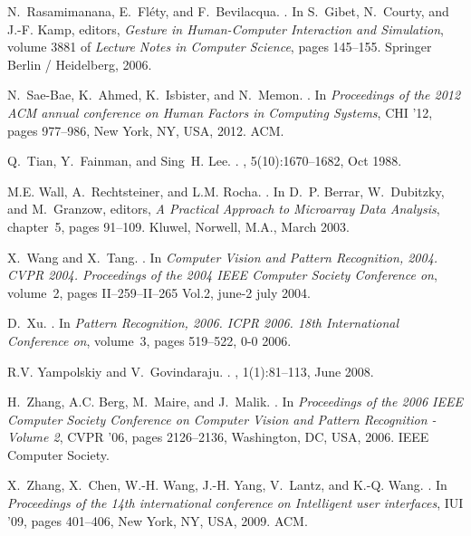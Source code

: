 \documentclass[]{article}
\begin{document}
\begin{thebibliography}{10}
N.~Rasamimanana, E.~Fl{\'e}ty, and F.~Bevilacqua.
.
\newblock In S.~Gibet, N.~Courty, and J.-F. Kamp, editors, {\em {Gesture in
  Human-Computer Interaction and Simulation}}, volume 3881 of {\em {Lecture
  Notes in Computer Science}}, pages 145--155. Springer Berlin / Heidelberg,
  2006.

N.~Sae-Bae, K.~Ahmed, K.~Isbister, and N.~Memon.
.
\newblock In {\em {Proceedings of the 2012 ACM annual conference on Human
  Factors in Computing Systems}}, {CHI '12}, pages 977--986, New York, NY, USA,
  2012. ACM.

Q.~Tian, Y.~Fainman, and Sing~H. Lee.
.
, 5(10):1670--1682, Oct 1988.

M.E. Wall, A.~Rechtsteiner, and L.M. Rocha.
.
\newblock In D.~P. Berrar, W.~Dubitzky, and M.~Granzow, editors, {\em {A
  Practical Approach to Microarray Data Analysis}}, chapter~5, pages 91--109.
  Kluwel, Norwell, M.A., March 2003.

X.~Wang and X.~Tang.
.
\newblock In {\em {Computer Vision and Pattern Recognition, 2004. {CVPR} 2004.
  Proceedings of the 2004 {IEEE} {C}omputer {S}ociety {C}onference on}},
  volume~2, pages II--259--II--265 Vol.2, june-2 july 2004.

D.~Xu.
.
\newblock In {\em {Pattern Recognition, 2006. ICPR 2006. 18th International
  Conference on}}, volume~3, pages 519--522, 0-0 2006.

R.V. Yampolskiy and V.~Govindaraju.
.
, 1(1):81--113, June 2008.

H.~Zhang, A.C. Berg, M.~Maire, and J.~Malik.
.
\newblock In {\em {Proceedings of the 2006 IEEE Computer Society Conference on
  Computer Vision and Pattern Recognition - Volume 2}}, {CVPR '06}, pages
  2126--2136, Washington, DC, USA, 2006. IEEE Computer Society.

X.~Zhang, X.~Chen, W.-H. Wang, J.-H. Yang, V.~Lantz, and K.-Q. Wang.
.
\newblock In {\em {Proceedings of the 14th international conference on
  Intelligent user interfaces}}, {IUI '09}, pages 401--406, New York, NY, USA,
  2009. ACM.
\end{thebibliography}
\end{document}

